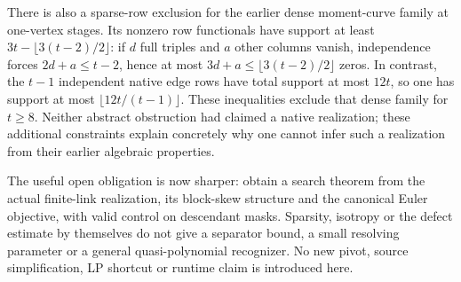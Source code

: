 There is also a sparse-row exclusion for the earlier dense moment-curve
family at one-vertex stages.  Its nonzero row functionals have support at
least $3t-\lfloor3(t-2)/2\rfloor$: if $d$ full triples and $a$ other
columns vanish, independence forces $2d+a\le t-2$, hence at most
$3d+a\le\lfloor3(t-2)/2\rfloor$ zeros.  In contrast, the $t-1$ independent
native edge rows have total support at most $12t$, so one has support at
most $\lfloor12t/(t-1)\rfloor$.  These inequalities exclude that dense
family for $t\ge8$.  Neither abstract obstruction had claimed a native
realization; these additional constraints explain concretely why one
cannot infer such a realization from their earlier algebraic properties.

The useful open obligation is now sharper: obtain a search theorem from
the actual finite-link realization, its block-skew structure and the
canonical Euler objective, with valid control on descendant masks.
Sparsity, isotropy or the defect estimate by themselves do not give a
separator bound, a small resolving parameter or a general quasi-polynomial
recognizer.  No new pivot, source simplification, LP shortcut or runtime
claim is introduced here.


